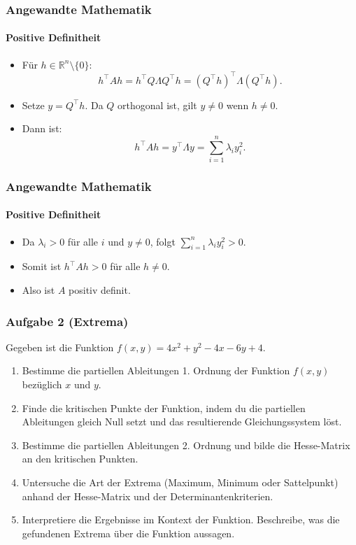 \documentclass{beamer}
\begin{document}
 \begin{frame}
    \frametitle{Angewandte Mathematik}
    \framesubtitle{Positive Definitheit}
     \begin{itemize}
         \item Für \( h \in \mathbb{R}^n \setminus \{0\} \):
         \[
         h^\top A h = h^\top Q \Lambda Q^\top h = (Q^\top h)^\top \Lambda (Q^\top h).
         \]
         \item Setze \( y = Q^\top h \). Da \( Q \) orthogonal ist, gilt \( y \neq 0 \) wenn \( h \neq 0 \).
         \item Dann ist:
         \[
         h^\top A h = y^\top \Lambda y = \sum_{i=1}^n \lambda_i y_i^2.
         \]
     \end{itemize}
 \end{frame}
 
 \begin{frame}
    \frametitle{Angewandte Mathematik}
    \framesubtitle{Positive Definitheit}
     \begin{itemize}
         \item Da \( \lambda_i > 0 \) für alle \( i \) und \( y \neq 0 \), folgt \( \sum_{i=1}^n \lambda_i y_i^2 > 0 \).
         \item Somit ist \( h^\top A h > 0 \) für alle \( h \neq 0 \).
         \item Also ist \( A \) positiv definit.
     \end{itemize}
 \end{frame}
 
 

 \begin{frame}
    \frametitle{Aufgabe 2 (Extrema)}
    Gegeben ist die Funktion \( f(x, y) = 4x^2 + y^2 - 4x - 6y + 4 \).
    
    \begin{enumerate}
        \item Bestimme die partiellen Ableitungen 1. Ordnung der Funktion \( f(x, y) \) bezüglich \( x \) und \( y \).
        \item Finde die kritischen Punkte der Funktion, indem du die partiellen Ableitungen gleich Null setzt und das resultierende Gleichungssystem löst.
        \item Bestimme die partiellen Ableitungen 2. Ordnung und bilde die Hesse-Matrix an den kritischen Punkten.
        \item Untersuche die Art der Extrema (Maximum, Minimum oder Sattelpunkt) anhand der Hesse-Matrix und der Determinantenkriterien.
        \item Interpretiere die Ergebnisse im Kontext der Funktion. Beschreibe, was die gefundenen Extrema über die Funktion aussagen.
    \end{enumerate}
\end{frame}
\end{document}
